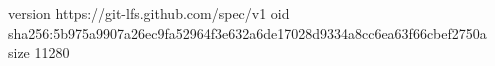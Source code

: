 version https://git-lfs.github.com/spec/v1
oid sha256:5b975a9907a26ec9fa52964f3e632a6de17028d9334a8cc6ea63f66cbef2750a
size 11280
